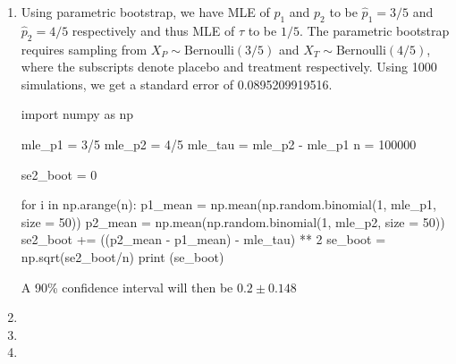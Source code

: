 \documentclass[a4paper,10pt]{article}
\theoremstyle{definition}
\begin{document}
\begin{enumerate}
\begin{enumerate}
\item Using parametric bootstrap, we have {\sffamily MLE} of $p_1$ and $p_2$ to be $\hat{p}_1 = 3/5$ and $\hat{p}_2 = 4/5$ respectively and thus {\sffamily MLE} of $\tau$ to be $1/5$. The parametric bootstrap requires sampling from $X_P \sim \text{Bernoulli}(3/5)$ and $X_T \sim \text{Bernoulli}(4/5)$, where the subscripts denote placebo and treatment respectively. Using 1000 simulations, we get a standard error of 0.0895209919516.
\begin{python}
import numpy as np

mle_p1 = 3/5
mle_p2 = 4/5
mle_tau = mle_p2 - mle_p1
n = 100000

se2_boot = 0

for i in np.arange(n):
    p1_mean = np.mean(np.random.binomial(1, mle_p1, size = 50))
    p2_mean = np.mean(np.random.binomial(1, mle_p2, size = 50))
    se2_boot += ((p2_mean - p1_mean) - mle_tau) ** 2
se_boot = np.sqrt(se2_boot/n)
print (se_boot)
\end{python}
A 90\% confidence interval will then be $0.2 \pm 0.148$
\item
\item
\item
\end{enumerate}
\end{enumerate}
\end{document}
